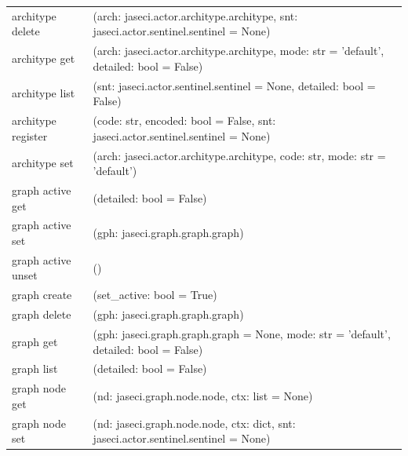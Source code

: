 {\begin{table}[ht]
\begin{tabular}{l p{10cm}}
            architype delete       & (arch: jaseci.actor.architype.architype, snt: jaseci.actor.sentinel.sentinel = None)                                  \\
            architype get          & (arch: jaseci.actor.architype.architype, mode: str = 'default', detailed: bool = False)                               \\
            architype list         & (snt: jaseci.actor.sentinel.sentinel = None, detailed: bool = False)                                                  \\
            architype register     & (code: str, encoded: bool = False, snt: jaseci.actor.sentinel.sentinel = None)                                        \\
            architype set          & (arch: jaseci.actor.architype.architype, code: str, mode: str = 'default')                                            \\
            graph active get       & (detailed: bool = False)                                                                                              \\
            graph active set       & (gph: jaseci.graph.graph.graph)                                                                                       \\
            graph active unset     & ()                                                                                                                    \\
            graph create           & (set\_active: bool = True)                                                                                            \\
            graph delete           & (gph: jaseci.graph.graph.graph)                                                                                       \\
            graph get              & (gph: jaseci.graph.graph.graph = None, mode: str = 'default', detailed: bool = False)                                 \\
            graph list             & (detailed: bool = False)                                                                                              \\
            graph node get         & (nd: jaseci.graph.node.node, ctx: list = None)                                                                        \\
            graph node set         & (nd: jaseci.graph.node.node, ctx: dict, snt: jaseci.actor.sentinel.sentinel = None)                                   \\

\end{tabular}
\end{table}}
